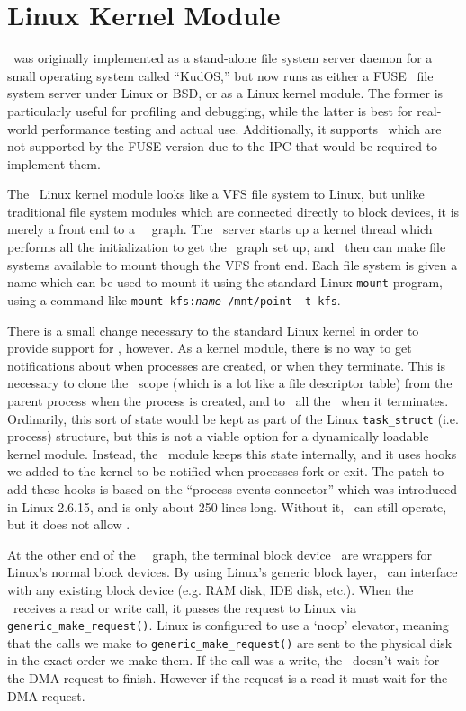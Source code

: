 \section{Linux Kernel Module}
\label{sec:linux}

\Kudos\ was originally implemented as a stand-alone file system server daemon
for a small operating system called ``KudOS,'' but now runs as either a
FUSE~\cite{fuse} file system server under Linux or BSD, or as a Linux kernel
module. The former is particularly useful for profiling and debugging, while the
latter is best for real-world performance testing and actual use. Additionally,
it supports \opgroups\ which are not supported by the FUSE version due to the
IPC that would be required to implement them.

The \Kudos\ Linux kernel module looks like a VFS file system to Linux, but
unlike traditional file system modules which are connected directly to block
devices, it is merely a front end to a \Kudos\ \module\ graph. The \Kudos\
server starts up a kernel thread which performs all the initialization to get
the \module\ graph set up, and \modules\ then can make file systems available to
mount though the VFS front end. Each file system is given a name which can be
used to mount it using the standard Linux \texttt{mount} program, using a
command like \mbox{\texttt{mount kfs:\textit{name} /mnt/point -t kfs}}.

There is a small change necessary to the standard Linux kernel in order to
provide support for \opgroups, however. As a kernel module, there is no way to
get notifications about when processes are created, or when they terminate. This
is necessary to clone the \opgroup\ scope (which is a lot like a file descriptor
table) from the parent process when the process is created, and to \abandon\ all
the \opgroups\ when it terminates. Ordinarily, this sort of state would be kept
as part of the Linux \texttt{task\_struct} (i.e. process) structure, but this is
not a viable option for a dynamically loadable kernel module. Instead, the
\Kudos\ module keeps this state internally, and it uses hooks we added to the
kernel to be notified when processes fork or exit. The patch to add these hooks
is based on the ``process events connector'' which was introduced in Linux
2.6.15, and is only about 250 lines long. Without it, \Kudos\ can still operate,
but it does not allow \opgroups.

At the other end of the \Kudos\ \module\ graph, the terminal block
device \modules\ are wrappers for Linux's normal block devices. By
using Linux's generic block layer, \Kudos\ can interface with any
existing block device (e.g. RAM disk, IDE disk, etc.). When the
\module\ receives a read or write call, it passes the request to Linux
via \texttt{generic\_make\_request()}. Linux is configured to use a
`noop' elevator, meaning that the calls we make to
\texttt{generic\_make\_request()} are sent to the physical disk in the
exact order we make them. If the call was a write, the \module\
doesn't wait for the DMA request to finish. However if the request is
a read it must wait for the DMA request.

